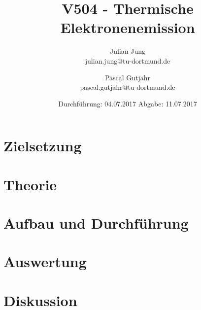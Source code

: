 

\title{V504 - Thermische Elektronenemission}
\author{Julian Jung \\ julian.jung@tu-dortmund.de
  \and Pascal Gutjahr \\ pascal.gutjahr@tu-dortmund.de}
  \date{Durchführung: 04.07.2017
  \hspace{3em}
  Abgabe: 11.07.2017}
  
\maketitle
\newpage
\tableofcontents
\newpage
\section{Zielsetzung}
\section{Theorie}
\section{Aufbau und Durchführung}
\section{Auswertung}
\section{Diskussion}
% 
\printbibliography

